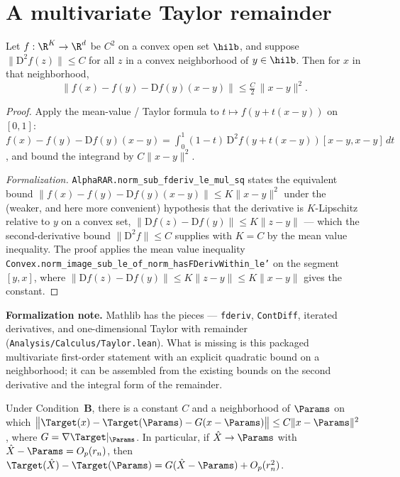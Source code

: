 \section{A multivariate Taylor remainder}
\label{sec:pre_taylor}

\begin{lemma}\label{lem:taylor_first_order}
\leanok
Let $f : \R^K \to \R^d$ be $C^2$ on a convex open set $\hilb$, and suppose
$\|\mathrm{D}^2 f(z)\| \le C$ for all $z$ in a convex neighborhood of $y \in \hilb$.
Then for $x$ in that neighborhood,
\[
  \big\| f(x) - f(y) - \mathrm{D}f(y)(x - y) \big\| \le \tfrac{C}{2}\,\|x - y\|^2.
\]
\end{lemma}

\begin{proof}\leanok
Apply the mean-value / Taylor formula to $t \mapsto f(y + t(x-y))$ on $[0,1]$:
$f(x) - f(y) - \mathrm{D}f(y)(x-y)
= \int_0^1 (1-t)\, \mathrm{D}^2 f(y + t(x-y))[x-y, x-y]\, dt$, and bound the
integrand by $C\|x-y\|^2$.

\emph{Formalization.} \texttt{AlphaRAR.norm\_sub\_fderiv\_le\_mul\_sq} states the equivalent bound
$\|f(x)-f(y)-\mathrm{D}f(y)(x-y)\| \le K\|x-y\|^2$ under the (weaker, and here more convenient)
hypothesis that the derivative is $K$-Lipschitz relative to $y$ on a convex set,
$\|\mathrm{D}f(z)-\mathrm{D}f(y)\| \le K\|z-y\|$ --- which the second-derivative bound
$\|\mathrm{D}^2 f\|\le C$ supplies with $K = C$ by the mean value inequality. The proof applies the
mean value inequality \texttt{Convex.norm\_image\_sub\_le\_of\_norm\_hasFDerivWithin\_le'} on the
segment $[y,x]$, where $\|\mathrm{D}f(z)-\mathrm{D}f(y)\|\le K\|z-y\|\le K\|x-y\|$ gives the constant.
\end{proof}

\textbf{Formalization note.} Mathlib has the pieces —
\texttt{fderiv}, \texttt{ContDiff}, iterated derivatives, and one-dimensional
Taylor with remainder (\texttt{Analysis/Calculus/Taylor.lean}). What is missing
is this packaged multivariate first-order statement with an explicit quadratic
bound on a neighborhood; it can be assembled from the existing bounds on the
second derivative and the integral form of the remainder.

\begin{corollary}\label{lem:taylor_rho}
Under Condition~\textbf{B}, there is a constant $C$ and a neighborhood of
$\Params$ on which
$\big\|\Target(x) - \Target(\Params) - G(x - \Params)\big\| \le C\|x - \Params\|^2$,
where $G = \nabla\Target|_\Params$. In particular, if $\hat X \to \Params$ with
$\hat X - \Params = O_p(r_n)$, then
$\Target(\hat X) - \Target(\Params) = G(\hat X - \Params) + O_p(r_n^2)$.
\end{corollary}

